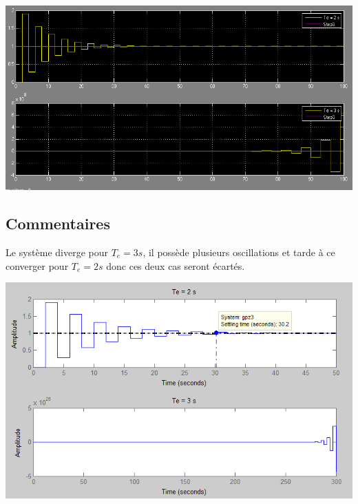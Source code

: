 \begin{appendices}
	\begin{center}
	\includegraphics[scale=0.5]{simu2.png}
	\label{fig6} 
	\end{center}
	
\subsection{Commentaires}

\par Le système diverge pour $T_e = 3 s$, il possède plusieurs oscillations et tarde à ce converger pour $T_e = 2 s$ donc ces deux cas seront écartés.\\

   	
	\begin{center}
	\includegraphics[scale=0.5]{mat2.png}
	\label{fig7} 
	\end{center}


\end{appendices}
